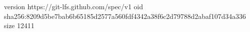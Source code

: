version https://git-lfs.github.com/spec/v1
oid sha256:8209d5be7bab6b65185d2577a560fdf4342a38f6c2d79788d2abaf107d34a336
size 12411
